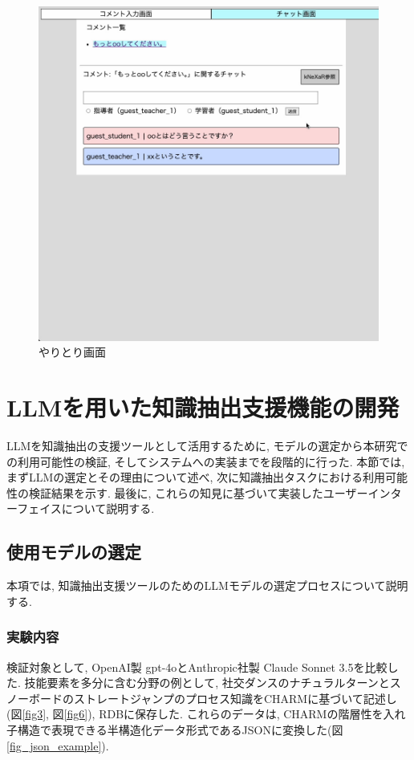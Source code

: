 \begin{figure}[htbp]
    \centering
    \includegraphics[width=1.0\linewidth]{./image/demo_chat.jpg}
    \caption{やりとり画面}
    \label{fig5}
\end{figure}



\section{LLMを用いた知識抽出支援機能の開発}
LLMを知識抽出の支援ツールとして活用するために, モデルの選定から本研究での利用可能性の検証, そしてシステムへの実装までを段階的に行った. 本節では, まずLLMの選定とその理由について述べ, 次に知識抽出タスクにおける利用可能性の検証結果を示す. 最後に, これらの知見に基づいて実装したユーザーインターフェイスについて説明する.


\subsection{使用モデルの選定}
本項では, 知識抽出支援ツールのためのLLMモデルの選定プロセスについて説明する. 

\subsubsection{実験内容}
検証対象として, OpenAI製 gpt-4oとAnthropic社製 Claude Sonnet 3.5を比較した. 技能要素を多分に含む分野の例として, 社交ダンスのナチュラルターンとスノーボードのストレートジャンプのプロセス知識をCHARMに基づいて記述し(図\ref{fig3}, 図\ref{fig6}), RDBに保存した. これらのデータは, CHARMの階層性を入れ子構造で表現できる半構造化データ形式であるJSONに変換した(図\ref{fig_json_example}). 

